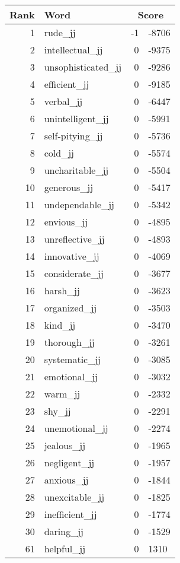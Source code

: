 \begin{longtable}[!htbp]{| rlr@{.}l |}
    \hline
    \textbf{Rank} & \textbf{Word} & \multicolumn{2}{c|}{\textbf{Score}} \\
    \hline
    \endhead
    1 & rude\_jj & -1 & -8706 \\
    2 & intellectual\_jj & 0 & -9375 \\
    3 & unsophisticated\_jj & 0 & -9286 \\
    4 & efficient\_jj & 0 & -9185 \\
    5 & verbal\_jj & 0 & -6447 \\
    6 & unintelligent\_jj & 0 & -5991 \\
    7 & self-pitying\_jj & 0 & -5736 \\
    8 & cold\_jj & 0 & -5574 \\
    9 & uncharitable\_jj & 0 & -5504 \\
    10 & generous\_jj & 0 & -5417 \\
    11 & undependable\_jj & 0 & -5342 \\
    12 & envious\_jj & 0 & -4895 \\
    13 & unreflective\_jj & 0 & -4893 \\
    14 & innovative\_jj & 0 & -4069 \\
    15 & considerate\_jj & 0 & -3677 \\
    16 & harsh\_jj & 0 & -3623 \\
    17 & organized\_jj & 0 & -3503 \\
    18 & kind\_jj & 0 & -3470 \\
    19 & thorough\_jj & 0 & -3261 \\
    20 & systematic\_jj & 0 & -3085 \\
    21 & emotional\_jj & 0 & -3032 \\
    22 & warm\_jj & 0 & -2332 \\
    23 & shy\_jj & 0 & -2291 \\
    24 & unemotional\_jj & 0 & -2274 \\
    25 & jealous\_jj & 0 & -1965 \\
    26 & negligent\_jj & 0 & -1957 \\
    27 & anxious\_jj & 0 & -1844 \\
    28 & unexcitable\_jj & 0 & -1825 \\
    29 & inefficient\_jj & 0 & -1774 \\
    30 & daring\_jj & 0 & -1529 \\
    61 & helpful\_jj & 0 & 1310 \\

\end{longtable}
